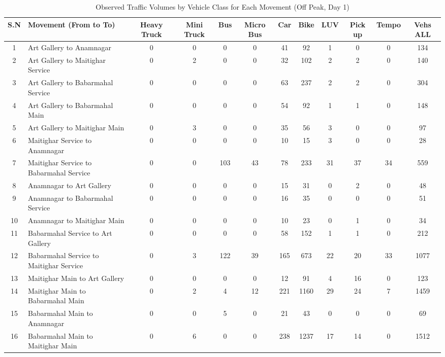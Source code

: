 \begin{landscape}
\begin{table}[h!]
\centering
\caption{Observed Traffic Volumes by Vehicle Class for Each Movement (Off Peak, Day 1)}
\small
\setlength{\tabcolsep}{5pt}

\begin{tabular}{|c|p{6cm}|c|c|c|c|c|c|c|c|c|c|}
\hline
S.N& Movement (From to To)& Heavy Truck & Mini Truck & Bus & Micro Bus & Car & Bike & LUV & Pick up & Tempo & Vehs ALL \\ \hline
1	&Art Gallery to Anamnagar	                &0	&0	&0	    &0	&41	&92	&1	&0	&0	&134 \\ \hline
2	&Art Gallery to Maitighar Service	        &0	&2	&0	    &0	&32	&102	&2	&2	&0	&140 \\ \hline
3	&Art Gallery to Babarmahal Service	        &0	&0	&0	    &0	&63	&237	&2	&2	&0	&304 \\ \hline
4	&Art Gallery to Babarmahal Main	            &0	&0	&0	    &0	&54	&92	&1	&1	&0	&148 \\ \hline
5	&Art Gallery to Maitighar Main	            &0	&3	&0	    &0	&35	&56	&3	&0	&0	&97 \\ \hline
6	&Maitighar Service to Anamnagar	            &0	&0	&0	    &0	&10	&15	&3	&0	&0	&28 \\ \hline
7	&Maitighar Service to Babarmahal Service	&0	&0	&103	&43	&78	&233	&31	&37	&34	&559 \\ \hline
8	&Anamnagar to Art Gallery	                &0	&0	&0	    &0	&15	&31	&0	&2	&0	&48 \\ \hline
9	&Anamnagar to Babarmahal Service	        &0	&0	&0	    &0	&16	&35	&0	&0	&0	&51 \\ \hline
10	&Anamnagar to Maitighar Main	            &0	&0	&0	    &0	&10	&23	&0	&1	&0	&34 \\ \hline
11	&Babarmahal Service to Art Gallery	        &0	&0	&0	    &0	&58	&152	&1	&1	&0	&212 \\ \hline
12	&Babarmahal Service to Maitighar Service	&0	&3	&122	&39	&165	&673	&22	&20	&33	&1077 \\ \hline
13	&Maitighar Main to Art Gallery	            &0	&0	&0	    &0	&12	&91	&4	&16	&0	&123 \\ \hline
14	&Maitighar Main to Babarmahal Main	        &0	&2	&4	    &12	&221	&1160	&29	&24	&7	&1459 \\ \hline
15	&Babarmahal Main to Anamnagar	            &0	&0	&5	    &0	&21	&43	&0	&0	&0	&69 \\ \hline
16	&Babarmahal Main to Maitighar Main	        &0	&6	&0	    &0	&238	&1237	&17	&14	&0	&1512 \\ \hline


\end{tabular}
\end{table}
\end{landscape}


